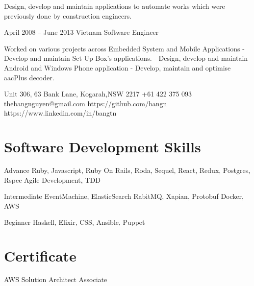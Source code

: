 \documentclass{tccv}
\begin{document}
\begin{eventlist}
    Design, develop and maintain applications to automate works which were previously done by construction engineers.

\item{April 2008 -- June 2013}
    {Vietnam}
    {Software Engineer}

    Worked on various projects across Embedded System and Mobile Applications
    \newline - Develop and maintain Set Up Box's applications.
    \newline - Design, develop and maintain Android and Windows Phone application
    \newline - Develop, maintain and optimise aacPlus decoder.

\end{eventlist}

\personal
    {Unit 306, 63 Bank Lane, Kogarah,\newline NSW 2217}
    {+61 422 375 093}
    {thebangnguyen@gmail.com}
    {https://github.com/bangn}
    {https://www.linkedin.com/in/bangtn}

\section{Software Development Skills}

\begin{factlist}

\item{Advance}
    {Ruby, Javascript, Ruby On Rails, Roda, Sequel, React, Redux, Postgres, Rspec
    \newline Agile Development, TDD}

\item{Intermediate}
    {EventMachine, ElasticSearch
    \newline RabitMQ, Xapian, Protobuf
    \newline Docker, AWS}

\item{Beginner}
    {Haskell, Elixir, CSS, Ansible, Puppet}
\end{factlist}

\section{Certificate}

\begin{factlist}

\item{AWS Solution Architect}
    {Associate}

\end{factlist}
\end{document}

